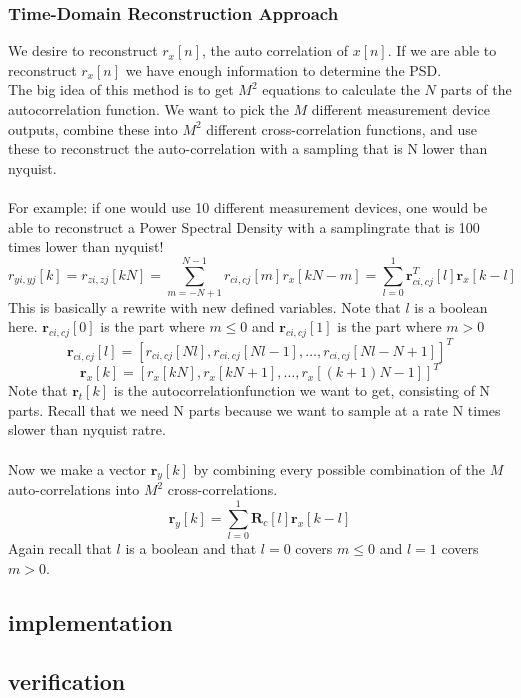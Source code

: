 \documentclass[report, oneside, a4paper, openany]{memoir}
\begin{document}
\subsubsection{Time-Domain Reconstruction Approach}
We desire to reconstruct $r_x[n]$, the auto correlation of $x[n]$. If we are able to reconstruct $r_x[n]$ we have enough information to determine the PSD.\\
The big idea of this method is to get $M^2$ equations to calculate the $N$ parts of the autocorrelation function. We want to pick the $M$ different measurement device outputs, combine these into $M^2$ different cross-correlation functions, and use these to reconstruct the auto-correlation with a sampling that is N lower than nyquist. \\
\\
For example: if  one would use 10 different measurement devices, one would be able to reconstruct a Power Spectral Density with a samplingrate that is 100 times lower than nyquist!
$$
r_{yi,yj}[k] = r_{zi,zj}[kN] = \sum_{m=-N+1}^{N-1}r_{ci,cj}[m]r_x[kN-m] = \sum_{l=0}^1\mathbf{r}^T_{ci,cj}[l]\mathbf{r}_x[k-l]
$$
This is basically a rewrite with new defined variables. Note that $l$ is a boolean here. $\mathbf{r}_{ci,cj}[0]$ is the part where $m\leq 0$ and $\mathbf{r}_{ci,cj}[1]$ is the part where $m > 0$ 
$$
\mathbf{r}_{ci,cj}[l] = [r_{ci,cj}[Nl], r_{ci,cj}[Nl-1], \dots, r_{ci,cj}[Nl-N+1]]^T
$$
$$
\mathbf{r}_x[k]= [r_x[kN],r_x[kN+1],\dots,r_x[(k+1)N-1]]^T
$$
Note that $\mathbf{r}_t[k]$ is the autocorrelationfunction we want to get, consisting of N parts. Recall that we need N parts because we want to sample at a rate N times slower than nyquist ratre.\\
\\
Now we make a vector $\mathbf{r}_y[k]$ by combining every possible combination of the $M$ auto-correlations into $M^2$ cross-correlations.
$$
\mathbf{r}_y[k]=\sum_{l=0}^1\mathbf{R}_c[l]\mathbf{r}_x[k-l]
$$
Again recall that $l$ is a boolean and that $l=0$ covers $m\leq 0$ and $l=1$ covers $m > 0$.




\subsection{implementation}

\subsection{verification}
\end{document}
